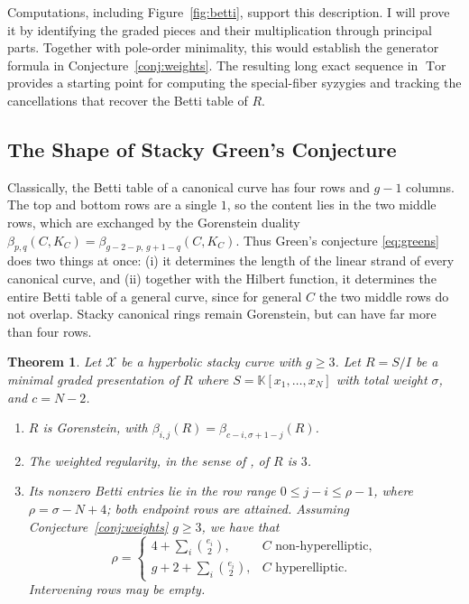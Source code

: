 \documentclass[11pt,reqno]{amsart}
\newtheorem{theorem}[lemma]{Theorem}
\theoremstyle{remark}
\newcommand{\Tor}{\operatorname{Tor}}
\newcommand{\KK}{\mathbb{K}}
\newcommand{\cX}{\mathcal{X}}
\begin{document}
Computations, including Figure~\ref{fig:betti}, support this description. I will prove it by identifying the graded pieces and their multiplication through principal parts. Together with pole-order minimality, this would establish the generator formula in Conjecture~\ref{conj:weights}. The resulting long exact sequence in $\Tor$ provides a starting point for computing the special-fiber syzygies and tracking the cancellations that recover the Betti table of $R$.

\subsection{The Shape of Stacky Green's Conjecture}\label{subsec:weighted-canonical}

Classically, the Betti table of a canonical curve has four rows and $g-1$ columns. The top and bottom rows are a single $1$, so the content lies in the two middle rows, which are exchanged by the Gorenstein duality $\beta_{p,q}(C,K_{C})=\beta_{g-2-p,\,g+1-q}(C,K_C)$. Thus Green's conjecture \eqref{eq:greens} does two things at once: (i) it determines the length of the linear strand of every canonical curve, and (ii) together with the Hilbert function, it determines the entire Betti table of a general curve, since for general $C$ the two middle rows do not overlap. Stacky canonical rings remain Gorenstein, but can have far more than four rows.

\begin{theorem}\label{thm:duality}
Let $\cX$ be a hyperbolic stacky curve with $g\geq3$. Let $R=S/I$ be a minimal graded presentation of $R$ where $S=\KK[x_1,\ldots,x_N]$ with  total weight $\sigma$, and $c=N-2$.
\begin{enumerate}
\item $R$ is Gorenstein, with $\beta_{i,j}(R)=\beta_{c-i,\sigma+1-j}(R)$.
\item The weighted regularity, in the sense of \cite{brownErman25}, of $R$ is $3$.
\item Its nonzero Betti entries lie in the row range $0\leq j-i\leq\rho-1$, where $\rho=\sigma-N+4$; both endpoint
rows are attained. Assuming Conjecture~\ref{conj:weights} $g\geq3$, we have that
\[
\rho=\begin{cases}
4+\sum_i\binom{e_i}{2},&C\text{ non-hyperelliptic},\\
g+2+\sum_i\binom{e_i}{2},&C\text{ hyperelliptic}.
\end{cases}
\]
Intervening rows may be empty.
\end{enumerate}
\end{theorem}
\end{document}
